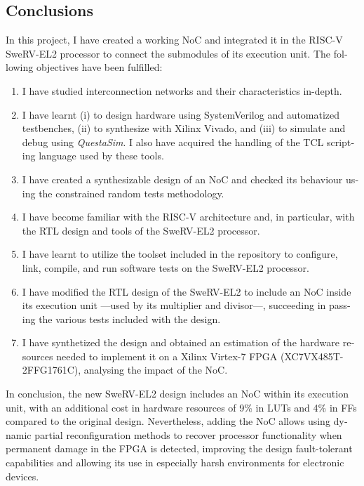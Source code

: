 \begin{otherlanguage}{english}
\addtocounter{chapter}{-1}
\chapter{Conclusions}
In this project, I have created a working NoC and integrated it in the \mbox{RISC-V} \mbox{SweRV-EL2} processor to connect the submodules of its execution unit. 
The following objectives have been fulfilled:

\begin{enumerate}[noitemsep]
    \item I have studied interconnection networks and their characteristics in-depth.
    \item I have learnt (i) to design hardware using SystemVerilog and automatized testbenches, (ii) to synthesize with Xilinx Vivado, and (iii) to simulate and debug using \textit{QuestaSim}. I also have acquired the handling of the TCL scripting language used by these tools.
    \item I have created a synthesizable design of an NoC and checked its behaviour using the constrained random tests methodology.
    \item I have become familiar with the RISC-V architecture and, in particular, with the RTL design and tools of the SweRV-EL2 processor.
    \item I have learnt to utilize the toolset included in the repository to configure, link, compile, and run software tests on the SweRV-EL2 processor. 
    \item I have modified the RTL design of the SweRV-EL2 to include an NoC inside its execution unit ---used by its multiplier and divisor---, succeeding in passing the various tests included with the design.
    \item I have synthetized the design and obtained an estimation of the hardware resources needed to implement it on a Xilinx Virtex-7 FPGA (XC7VX485T-2FFG1761C), analysing the impact of the NoC.
\end{enumerate}

In conclusion, the new SweRV-EL2 design includes an NoC within its execution unit, with an additional cost in hardware resources of 9\% in LUTs and 4\% in FFs compared to the original design.
Nevertheless, adding the NoC allows using dynamic partial reconfiguration methods to recover processor functionality when permanent damage in the FPGA is detected, improving the design fault-tolerant capabilities and allowing its use in especially harsh environments for electronic devices.
\end{otherlanguage}